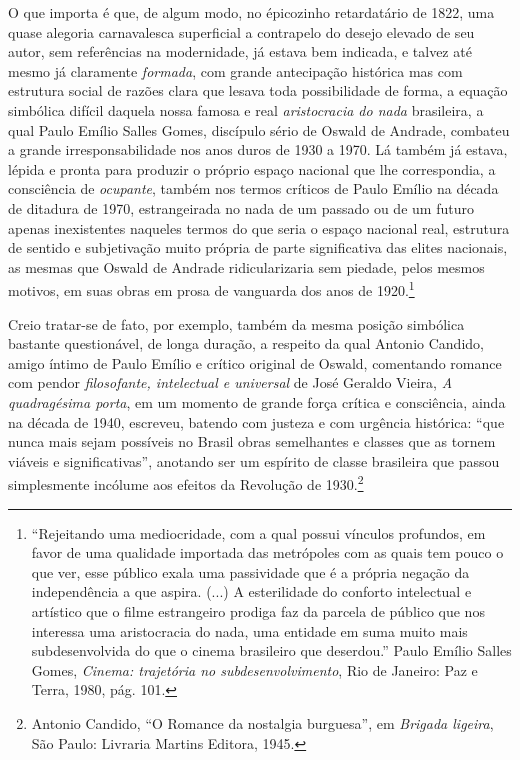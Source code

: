 O que importa é que, de algum modo, no épicozinho retardatário de 1822,
uma quase alegoria carnavalesca superficial a contrapelo do desejo
elevado de seu autor, sem referências na modernidade, já estava bem
indicada, e talvez até mesmo já claramente \emph{formada}, com grande
antecipação histórica mas com estrutura social de razões clara que
lesava toda possibilidade de forma, a equação simbólica difícil daquela
nossa famosa e real \emph{aristocracia do nada} brasileira, a qual Paulo
Emílio Salles Gomes, discípulo sério de Oswald de Andrade, combateu a
grande irresponsabilidade nos anos duros de 1930 a 1970. Lá também já
estava, lépida e pronta para produzir o próprio espaço nacional que lhe
correspondia, a consciência de \emph{ocupante}, também nos termos
críticos de Paulo Emílio na década de ditadura de 1970, estrangeirada no
nada de um passado ou de um futuro apenas inexistentes naqueles termos
do que seria o espaço nacional real, estrutura de sentido e subjetivação
muito própria de parte significativa das elites nacionais, as mesmas que
Oswald de Andrade ridicularizaria sem piedade, pelos mesmos motivos, em
suas obras em prosa de vanguarda dos anos de 1920.\footnote{``Rejeitando
  uma mediocridade, com a qual possui vínculos profundos, em favor de
  uma qualidade importada das metrópoles com as quais tem pouco o que
  ver, esse público exala uma passividade que é a própria negação da
  independência a que aspira. (...) A esterilidade do conforto
  intelectual e artístico que o filme estrangeiro prodiga faz da parcela
  de público que nos interessa uma aristocracia do nada, uma entidade em
  suma muito mais subdesenvolvida do que o cinema brasileiro que
  deserdou.'' Paulo Emílio Salles Gomes, \emph{Cinema: trajetória no
  subdesenvolvimento}, Rio de Janeiro: Paz e Terra, 1980, pág. 101.}

Creio tratar-se de fato, por exemplo, também da mesma posição simbólica
bastante questionável, de longa duração, a respeito da qual Antonio
Candido, amigo íntimo de Paulo Emílio e crítico original de Oswald,
comentando romance com pendor \emph{filosofante, intelectual e
universal} de José Geraldo Vieira, \emph{A quadragésima porta}, em um
momento de grande força crítica e consciência, ainda na década de 1940,
escreveu, batendo com justeza e com urgência histórica: ``que nunca mais
sejam possíveis no Brasil obras semelhantes e classes que as tornem
viáveis e significativas'', anotando ser um espírito de classe
brasileira que passou simplesmente incólume aos efeitos da Revolução de
1930.\footnote{Antonio Candido, ``O Romance da nostalgia burguesa'', em
  \emph{Brigada ligeira}, São Paulo: Livraria Martins Editora, 1945.}

